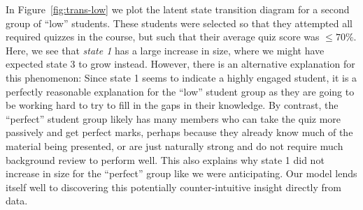 In Figure~\ref{fig:trans-low} we plot the latent state transition diagram
for a second group of ``low'' students. These students were selected so
that they attempted all required quizzes in the course, but such that their
average quiz score was $\leq 70\%$. Here, we see that \emph{state 1} has a
large increase in size, where we might have expected state 3 to grow
instead.  However, there is an alternative explanation for this phenomenon:
Since state 1 seems to indicate a highly engaged student, it is a perfectly
reasonable explanation for the ``low'' student group as they are going to
be working hard to try to fill in the gaps in their knowledge. By contrast,
the ``perfect'' student group likely has many members who can take the quiz
more passively and get perfect marks, perhaps because they already know
much of the material being presented, or are just naturally strong and do
not require much background review to perform well. This also explains why
state 1 did not increase in size for the ``perfect'' group like we were
anticipating. Our model lends itself well to discovering this potentially
counter-intuitive insight directly from data.
